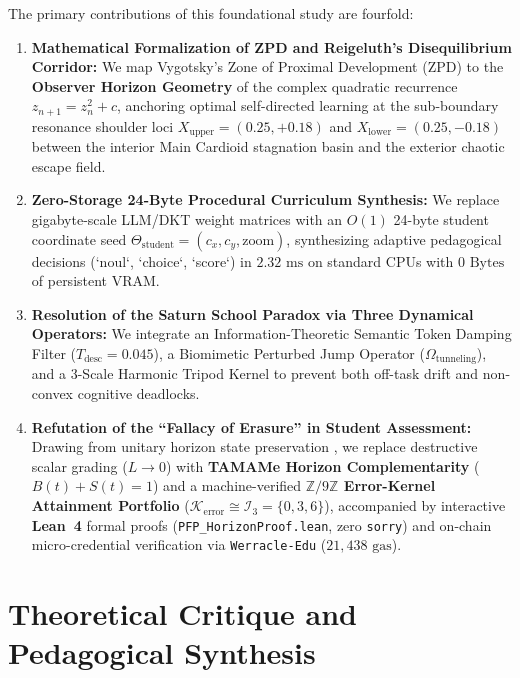 \documentclass[10pt,twocolumn,a4paper]{article}
\begin{document}
The primary contributions of this foundational study are fourfold:
\begin{enumerate}[leftmargin=*,nosep]
    \item \textbf{Mathematical Formalization of ZPD and Reigeluth's Disequilibrium Corridor:} We map Vygotsky's Zone of Proximal Development (ZPD) \cite{vygotsky1978mind} to the \textbf{Observer Horizon Geometry} of the complex quadratic recurrence $z_{n+1} = z_n^2 + c$, anchoring optimal self-directed learning at the sub-boundary resonance shoulder loci $X_{\text{upper}} = (0.25, +0.18)$ and $X_{\text{lower}} = (0.25, -0.18)$ between the interior Main Cardioid stagnation basin and the exterior chaotic escape field.
    \item \textbf{Zero-Storage 24-Byte Procedural Curriculum Synthesis:} We replace gigabyte-scale LLM/DKT weight matrices with an $O(1)$ 24-byte student coordinate seed $\Theta_{\text{student}} = (c_x, c_y, \text{zoom})$, synthesizing adaptive pedagogical decisions (`noul`, `choice`, `score`) in $2.32\text{ ms}$ on standard CPUs with $0\text{ Bytes}$ of persistent VRAM.
    \item \textbf{Resolution of the Saturn School Paradox via Three Dynamical Operators:} We integrate an Information-Theoretic Semantic Token Damping Filter ($T_{\text{desc}} = 0.045$), a Biomimetic Perturbed Jump Operator ($\Omega_{\text{tunneling}}$), and a 3-Scale Harmonic Tripod Kernel to prevent both off-task drift and non-convex cognitive deadlocks.
    \item \textbf{Refutation of the ``Fallacy of Erasure'' in Student Assessment:} Drawing from unitary horizon state preservation \cite{dagli2026pagecurve}, we replace destructive scalar grading ($L \to 0$) with \textbf{TAMAMe Horizon Complementarity} ($B(t) + S(t) = 1$) and a machine-verified \textbf{$\mathbb{Z}/9\mathbb{Z}$ Error-Kernel Attainment Portfolio} ($\mathcal{K}_{\text{error}} \cong \mathcal{I}_3 = \{0, 3, 6\}$), accompanied by interactive \textbf{Lean~4} formal proofs (\texttt{PFP\_HorizonProof.lean}, zero \texttt{sorry}) and on-chain micro-credential verification via \texttt{Werracle-Edu} ($21,438\text{ gas}$).
\end{enumerate}

\section{Theoretical Critique and Pedagogical Synthesis}
\end{document}
